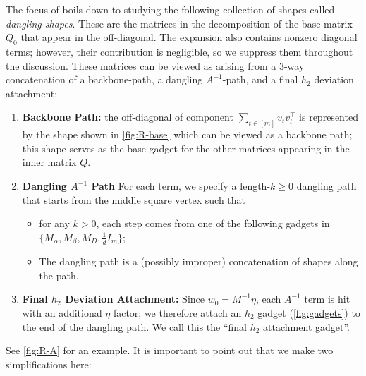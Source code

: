 \documentclass[12pt]{article}
\def \al {\alpha}
\begin{document}
The focus of \cite{PTVW22, HKPX23} boils down to studying the following collection of shapes called \emph{dangling shapes}. These are the matrices in the decomposition of the base matrix $Q_0$ that appear in the off-diagonal. The expansion also contains nonzero diagonal terms; however, their contribution is negligible, so we suppress them throughout the discussion. These matrices can be viewed as arising from a $3$-way concatenation of a backbone-path, a dangling $A^{-1}$-path, and a final $h_2$ deviation attachment:
    \begin{enumerate}
        \item \textbf{Backbone Path:} the off-diagonal of component $\sum_{t\in [m]} v_tv_t^\top $ is represented by the shape shown in \cref{fig:R-base} which can be viewed as a backbone path; this shape serves as
the base gadget for the other matrices appearing in the inner matrix $Q$.
	\item \textbf{Dangling $A^{-1}$ Path} 
    For each term, we specify a length-$k\geq 0$ dangling path that starts from the middle square vertex such that
    \begin{itemize}
        \item for any $k>0$, each step comes from one of the following gadgets in $\{ M_\al, M_\beta, M_D, \frac{1}{d}I_m\}$;
        \item The dangling path is a (possibly improper) concatenation of shapes along the path.    \end{itemize}
    \item \textbf{Final $h_2$ Deviation Attachment:} Since $w_0 = M^{-1} \eta$, each $A^{-1}$ term is hit with an additional $\eta$ factor; we therefore attach an $h_2$ gadget (\cref{fig:gadgets}) to the end of the dangling path.
    We call this the ``final $h_2$ attachment gadget''.

    \end{enumerate}
See \cref{fig:R-A} for an example. It is important to point out that we make two simplifications here: 
\end{document}
